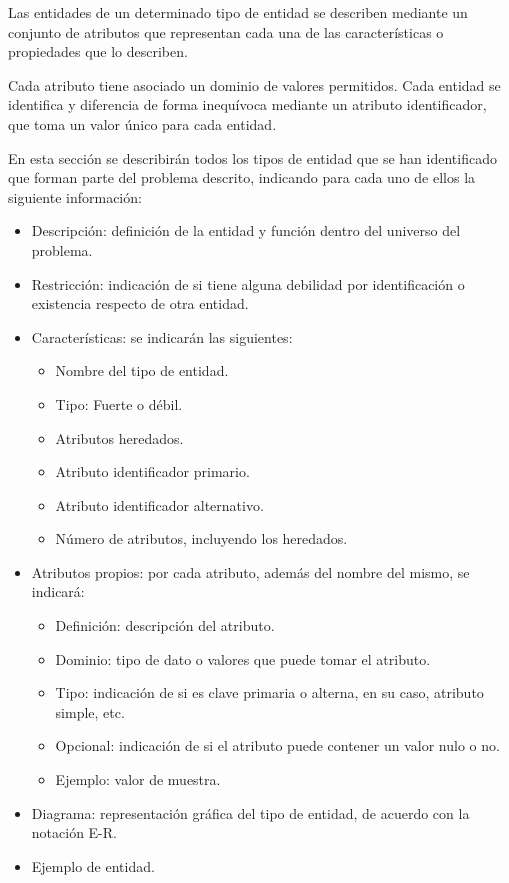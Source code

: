 Las entidades de un determinado tipo de entidad se describen mediante un conjunto
de atributos que representan cada una de las características o propiedades que lo describen.

Cada atributo tiene asociado un dominio de valores permitidos. Cada entidad se identifica y diferencia de forma inequívoca mediante un atributo identificador, que toma un valor único para cada entidad.

En esta sección se describirán todos los tipos de entidad que se han identificado
que forman parte del problema descrito, indicando para cada uno de ellos la siguiente
información:

\begin{itemize}
    \item Descripción: definición de la entidad y función dentro del universo del problema.
    
    \item Restricción: indicación de si tiene alguna debilidad por identificación o existencia respecto de otra entidad.
    
    \item Características: se indicarán las siguientes: 
    \begin{itemize}
        \item Nombre del tipo de entidad.
        \item Tipo: Fuerte o débil.
        \item Atributos heredados.
        \item Atributo identificador primario.
        \item Atributo identificador alternativo.
        \item Número de atributos, incluyendo los heredados.
    \end{itemize}
    
    \item Atributos propios: por cada atributo, además del nombre del mismo, se indicará:
    \begin{itemize}
        \item Definición: descripción del atributo.
        \item Dominio: tipo de dato o valores que puede tomar el atributo.
        \item Tipo: indicación de si es clave primaria o alterna, en su caso, atributo simple, etc.
        \item Opcional: indicación de si el atributo puede contener un valor nulo o no.
        \item Ejemplo: valor de muestra.
    \end{itemize}
    
    \item Diagrama: representación gráfica del tipo de entidad, de acuerdo con la notación E-R.
    
    \item Ejemplo de entidad.
\end{itemize}    

